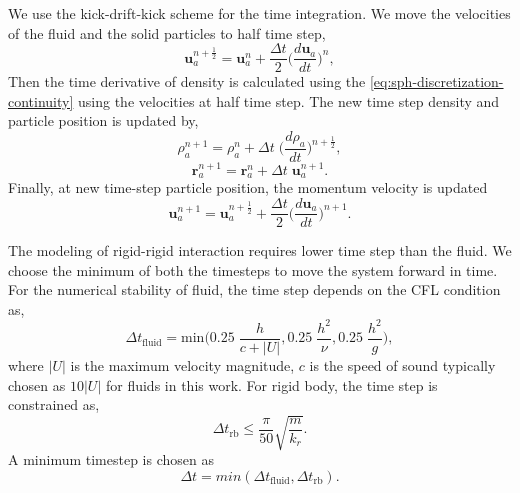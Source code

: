 \documentclass[preprint,12pt]{elsarticle}
\newcommand{\ten}[1]{\ensuremath{\mathbf{#1}}}
\begin{document}
We use the kick-drift-kick scheme for the time integration. We move the
velocities of the fluid and the solid particles to half time step,
\begin{equation}
  \label{eq:velocity-update-stage-1}
  \ten{u}_a^{n+\frac{1}{2}} = \ten{u}_a^{n} + \frac{\Delta t}{2} \bigg(\frac{d\ten{u}_{a}}{dt}\bigg)^n,
\end{equation}
Then the time derivative of density is calculated using the
\cref{eq:sph-discretization-continuity} using the velocities at half time
step. The new time step density and particle position is updated by,
\begin{equation}
  \label{eq:density-update-stage-2}
  \rho_{a}^{n+1} = \rho_{a}^{n} + \Delta t \; \bigg(\frac{d\rho_{a}}{dt}\bigg)^{n+\frac{1}{2}},
\end{equation}
\begin{equation}
  \label{eq:position-update-stage-2}
  \ten{r}_{a}^{n+1} = \ten{r}_{a}^{n} + \Delta t \; \ten{u}_{a}^{n+1}.
\end{equation}
%
Finally, at new time-step particle position, the momentum velocity is updated
\begin{equation}
  \label{eq:velocity-update-stage-3}
  \ten{u}_a^{n+1} = \ten{u}_a^{n+\frac{1}{2}} + \frac{\Delta t}{2} \bigg(\frac{d\ten{u}_{a}}{dt}\bigg)^{n+1}.
\end{equation}


The modeling of rigid-rigid interaction requires lower time step than the
fluid. We choose the minimum of both the timesteps to move the system forward
in time. For the numerical stability of fluid, the time step depends on the
CFL condition as,
\begin{equation}
  \label{eq:rfc:time-step-cfl}
  \Delta t_{\text{fluid}} = \mathrm{min} \bigg( 0.25 \; \frac{h}{c + |U|} ,  0.25 \; \frac{h^2}{\nu},  0.25 \; \frac{h^2}{g} \bigg),
\end{equation}
where $|U|$ is the maximum velocity magnitude, $c$ is the speed of sound
typically chosen as $10 |U|$ for fluids in this work. For rigid body, the time
step is constrained as,
\begin{equation}
  \label{eq:rfc:time-step-body-force}
  \Delta t_{\text{rb}} \leq \frac{\pi}{50} \sqrt{\frac{m}{k_r}}.
\end{equation}
A minimum timestep is chosen as
\begin{equation}
  \label{eq:rfc:time-step-body-force}
  \Delta t = min(\Delta t_{\text{fluid}}, \Delta t_{\text{rb}}).
\end{equation}
\end{document}
